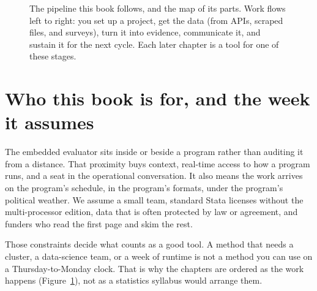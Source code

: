 \documentclass[
    a4paper,
    fontsize=10pt,
    twoside=true,
    numbers=noenddot,
]{kaobook}
\begin{document}
\begin{figure}
\centering
{}
\caption[The embedded evaluator's pipeline]{The pipeline this book follows, and the map of its parts. Work flows left to right: you set up a project, get the data (from APIs, scraped files, and surveys), turn it into evidence, communicate it, and sustain it for the next cycle. Each later chapter is a tool for one of these stages.}
\label{fig:pipeline}
\end{figure}

\section{Who this book is for, and the week it assumes}
The embedded evaluator sits inside or beside a program rather than auditing it from a distance. That proximity buys context, real-time access to how a program runs, and a seat in the operational conversation. It also means the work arrives on the program's schedule, in the program's formats, under the program's political weather. We assume a small team, standard Stata licenses without the multi-processor edition, data that is often protected by law or agreement, and funders who read the first page and skim the rest.

Those constraints decide what counts as a good tool. A method that needs a cluster, a data-science team, or a week of runtime is not a method you can use on a Thursday-to-Monday clock. That is why the chapters are ordered as the work happens (Figure~\ref{fig:pipeline}), not as a statistics syllabus would arrange them.
\end{document}
